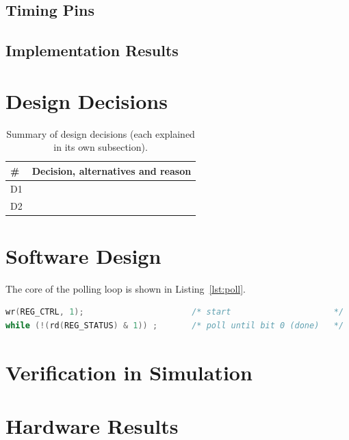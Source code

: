 \subsection{Timing Pins}\todo{}
\subsection{Implementation Results}

\section{Design Decisions}
\begin{table}[H]
\centering
\caption{Summary of design decisions (each explained in its own subsection).}
\label{tab:decisions}
\small
\begin{tabularx}{\linewidth}{@{}lX@{}}
\toprule
\textbf{\#} & \textbf{Decision, alternatives and reason} \\
\midrule
D1 & \todo{} \\
D2 & \todo{} \\
\bottomrule
\end{tabularx}
\end{table}

\section{Software Design}
The core of the polling loop is shown in Listing~\ref{lst:poll}.
\begin{lstlisting}[language=C,caption={Starting the accelerator and polling its status register.},label={lst:poll}]
wr(REG_CTRL, 1);                      /* start                     */
while (!(rd(REG_STATUS) & 1)) ;       /* poll until bit 0 (done)   */
\end{lstlisting}

\section{Verification in Simulation}\label{sec:verification}
\section{Hardware Results}\label{sec:results}
